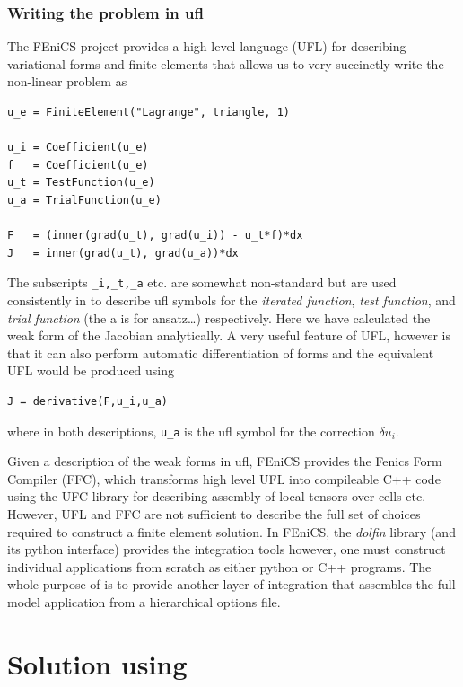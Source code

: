 \subsubsection{Writing the problem in ufl}
\label{sec:writing-problem-ufl}

The FEniCS project provides a  high level language (UFL) for describing
variational forms and finite elements that allows us to very succinctly write the
non-linear problem  as 
\begin{lstlisting}[style=UFL]
u_e = FiniteElement("Lagrange", triangle, 1)

u_i = Coefficient(u_e)
f   = Coefficient(u_e)
u_t = TestFunction(u_e)
u_a = TrialFunction(u_e)

F   = (inner(grad(u_t), grad(u_i)) - u_t*f)*dx
J   = inner(grad(u_t), grad(u_a))*dx
\end{lstlisting}
The subscripts \texttt{\_i,\_t,\_a} etc. are somewhat non-standard but
are used consistently in \TF{} to describe ufl symbols for the
\emph{iterated function}, \emph{test function}, and \emph{trial
  function} (the a is for ansatz\ldots{}) respectively.  Here we have
calculated the weak form of the Jacobian analytically. A very useful
feature of UFL, however is that it can also perform automatic
differentiation of forms and the equivalent UFL would be produced
using
\begin{lstlisting}[style=UFL]
J = derivative(F,u_i,u_a)
\end{lstlisting}
where in both descriptions, \texttt{u\_a} is the ufl symbol for the
correction $\delta u_{i}$.  

Given a description of the weak forms in ufl,  FEniCS provides the
Fenics Form Compiler (FFC), which transforms high level UFL into
compileable C++ code using the UFC library for describing assembly of
local tensors over cells etc.  However, UFL and FFC are not sufficient
to describe the full set of choices required to construct a finite
element solution.  In FEniCS,  the \emph{dolfin} library (and its
python interface) provides the integration tools however, one must
construct individual applications from scratch as either python or C++
programs.  The whole purpose of \TF{} is to provide another layer of
integration that assembles the full model application from a
hierarchical options file. 



\section{Solution using \TF}
\label{sec:solution-using-tf}

